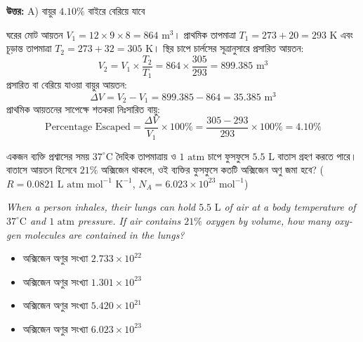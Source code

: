 \documentclass[12pt, a4paper]{article}
\begin{document}
\vspace{0.5em}
\begin{tcolorbox}[answerbox]
    \textbf{\color{success} উত্তর:} A) বায়ুর $4.10\%$ বাইরে বেরিয়ে যাবে
\end{tcolorbox}
\vspace{1em}

\begin{tcolorbox}[solutionbox={সমাধান (Solution)}]
    \noindent
    ঘরের মোট আয়তন $V_1 = 12 \times 9 \times 8 = 864\text{ m}^3$। প্রাথমিক তাপমাত্রা $T_1 = 273 + 20 = 293\text{ K}$ এবং চূড়ান্ত তাপমাত্রা $T_2 = 273 + 32 = 305\text{ K}$। স্থির চাপে চার্লসের সূত্রানুসারে প্রসারিত আয়তন:
    \[ V_2 = V_1 \times \frac{T_2}{T_1} = 864 \times \frac{305}{293} = 899.385\text{ m}^3 \]
    প্রসারিত বা বেরিয়ে যাওয়া বায়ুর আয়তন:
    \[ \Delta V = V_2 - V_1 = 899.385 - 864 = 35.385\text{ m}^3 \]
    প্রাথমিক আয়তনের সাপেক্ষে শতকরা নিঃসারিত বায়ু:
    \[ \text{Percentage Escaped} = \frac{\Delta V}{V_1} \times 100\% = \frac{305 - 293}{293} \times 100\% = \mathbf{4.10\%} \]
\end{tcolorbox}

\vspace{2em}

\begin{tcolorbox}[questionbox={প্রশ্ন (Question) 9}]
    \noindent
    একজন ব্যক্তি প্রশ্বাসের সময় $37^\circ\text{C}$ দৈহিক তাপমাত্রায় ও $1\text{ atm}$ চাপে ফুসফুসে $5.5\text{ L}$ বাতাস গ্রহণ করতে পারে। বাতাসে আয়তন হিসেবে $21\%$ অক্সিজেন থাকলে, ওই ব্যক্তির ফুসফুসে কতটি অক্সিজেন অণু জমা হবে? ($R = 0.0821\text{ L atm mol}^{-1}\text{ K}^{-1}$, $N_A = 6.023 \times 10^{23}\text{ mol}^{-1}$)
    
    \vspace{0.8em}
    \begin{english}
    \noindent\textit{\color{darkgray}
    When a person inhales, their lungs can hold $5.5\text{ L}$ of air at a body temperature of $37^\circ\text{C}$ and $1\text{ atm}$ pressure. If air contains $21\%$ oxygen by volume, how many oxygen molecules are contained in the lungs?
    }
    \end{english}
\end{tcolorbox}

\begin{itemize}[label={}, leftmargin=1cm, itemsep=0.5em]
    \item[\textbf{A)}] অক্সিজেন অণুর সংখ্যা $2.733 \times 10^{22}$
    \item[\textbf{B)}] অক্সিজেন অণুর সংখ্যা $1.301 \times 10^{23}$
    \item[\textbf{C)}] অক্সিজেন অণুর সংখ্যা $5.420 \times 10^{21}$
    \item[\textbf{D)}] অক্সিজেন অণুর সংখ্যা $6.023 \times 10^{23}$
\end{itemize}
\end{document}
